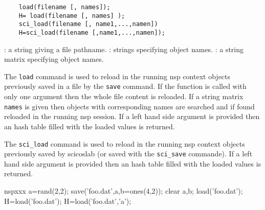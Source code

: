 \begin{mandesc}
\end{mandesc}

\begin{calling_sequence}
  \begin{verbatim}
    load(filename [, names]);
    H= load(filename [, names] );
    sci_load(filename [, name1,...,namen])  
    H=sci_load(filename [,name1,...,namen]);
  \end{verbatim}
\end{calling_sequence}
\begin{parameters}
  \begin{varlist}
    : a string giving a file pathname.
    : strings specifying object names. 
    : a string matrix specifying object names. 
  \end{varlist}
\end{parameters}
\begin{mandescription}
  The \verb!load! command is used to reload in the running nsp context 
  objects previously saved in a file by the \verb!save! command. 
  If the function is called with only one argument then the 
  whole file content is reloaded. If a string matrix \verb!names! is given then 
  objects with corresponding names are searched and if found reloaded in 
  the running nsp session. 
  If a left hand side argument is provided then an hash table 
  filled with the loaded values is returned.
  
  The \verb!sci_load! command is used to reload in the running nsp context
  objects previously saved by scicoslab (or saved with the  \verb!sci_save! 
  commande). If a left hand side argument is provided then an hash table 
  filled with the loaded values is returned.
\end{mandescription}
\begin{examples}
  \begin{mintednsp}{nspxxx}
a=rand(2,2);
    save('foo.dat',a,b=ones(4,2));
    clear a,b;
    load('foo.dat');
    H=load('foo.dat');
    H=load('foo.dat','a');
  \end{mintednsp}
\end{examples}
\begin{manseealso}
\end{manseealso}

